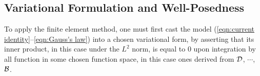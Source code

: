 \subsection{Variational Formulation and Well-Posedness}
    
    To apply the finite element method, one must first cast the model (\ref{eqn:current identity}–\ref{eqn:Gauss's law}) into a chosen variational form, by asserting that its inner product, in this case under the $L^{2}$ norm, is equal to $0$ upon integration by all function in some chosen function space, in this case ones derived from $\mathcal{D}$, $\cdots$, $\mathcal{B}$.
    
    
    
    
    